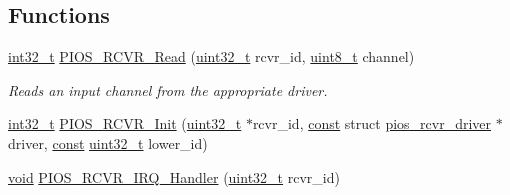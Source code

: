 \subsection*{Functions}
\begin{DoxyCompactItemize}
\item 
\hyperlink{group___n_a_m_e_gafd12020da5a235dfcf0c3c748fb5baed}{int32\-\_\-t} \hyperlink{group___p_i_o_s___r_c_v_r_ga91b274787094f69d6f10c29de5bac5cc}{P\-I\-O\-S\-\_\-\-R\-C\-V\-R\-\_\-\-Read} (\hyperlink{stdint_8h_a435d1572bf3f880d55459d9805097f62}{uint32\-\_\-t} rcvr\-\_\-id, \hyperlink{stdint_8h_aba7bc1797add20fe3efdf37ced1182c5}{uint8\-\_\-t} channel)
\begin{DoxyCompactList}\small\item\em Reads an input channel from the appropriate driver. \end{DoxyCompactList}\item 
\hyperlink{group___n_a_m_e_gafd12020da5a235dfcf0c3c748fb5baed}{int32\-\_\-t} \hyperlink{group___p_i_o_s___r_c_v_r_gaafd8582e763d23ca96b4eef942078811}{P\-I\-O\-S\-\_\-\-R\-C\-V\-R\-\_\-\-Init} (\hyperlink{stdint_8h_a435d1572bf3f880d55459d9805097f62}{uint32\-\_\-t} $\ast$rcvr\-\_\-id, \hyperlink{group___n_a_m_e_ga7ae6d0e43244213b34de2c2b9aa30da6}{const} struct \hyperlink{structpios__rcvr__driver}{pios\-\_\-rcvr\-\_\-driver} $\ast$driver, \hyperlink{group___n_a_m_e_ga7ae6d0e43244213b34de2c2b9aa30da6}{const} \hyperlink{stdint_8h_a435d1572bf3f880d55459d9805097f62}{uint32\-\_\-t} lower\-\_\-id)
\item 
\hyperlink{group___n_a_m_e_ga18028b8badbf1ea7e704ccac3c488e82}{void} \hyperlink{group___p_i_o_s___r_c_v_r_gaeb2454aa08c09917c456efe2919ee5e3}{P\-I\-O\-S\-\_\-\-R\-C\-V\-R\-\_\-\-I\-R\-Q\-\_\-\-Handler} (\hyperlink{stdint_8h_a435d1572bf3f880d55459d9805097f62}{uint32\-\_\-t} rcvr\-\_\-id)
\end{DoxyCompactItemize}
